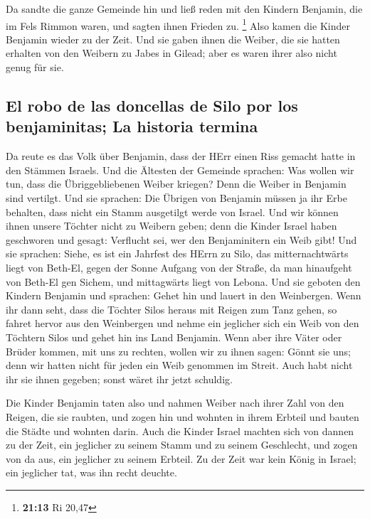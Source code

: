  Da sandte die ganze Gemeinde hin und ließ reden mit den
Kindern Benjamin, die im Fels Rimmon waren, und sagten ihnen Frieden zu.
\footnote{\textbf{21:13} Ri 20,47}  Also kamen die Kinder
Benjamin wieder zu der Zeit. Und sie gaben ihnen die Weiber, die sie
hatten erhalten von den Weibern zu Jabes in Gilead; aber es waren ihrer
also nicht genug für sie.

\hypertarget{el-robo-de-las-doncellas-de-silo-por-los-benjaminitas-la-historia-termina}{%
\subsection{El robo de las doncellas de Silo por los benjaminitas; La
historia
termina}\label{el-robo-de-las-doncellas-de-silo-por-los-benjaminitas-la-historia-termina}}

 Da reute es das Volk über Benjamin, dass der HErr einen
Riss gemacht hatte in den Stämmen Israels.  Und die
Ältesten der Gemeinde sprachen: Was wollen wir tun, dass die
Übriggebliebenen Weiber kriegen? Denn die Weiber in Benjamin sind
vertilgt.  Und sie sprachen: Die Übrigen von Benjamin
müssen ja ihr Erbe behalten, dass nicht ein Stamm ausgetilgt werde von
Israel.  Und wir können ihnen unsere Töchter nicht zu
Weibern geben; denn die Kinder Israel haben geschworen und gesagt:
Verflucht sei, wer den Benjaminitern ein Weib gibt!  Und
sie sprachen: Siehe, es ist ein Jahrfest des HErrn zu Silo, das
mitternachtwärts liegt von Beth-El, gegen der Sonne Aufgang von der
Straße, da man hinaufgeht von Beth-El gen Sichem, und mittagwärts liegt
von Lebona.  Und sie geboten den Kindern Benjamin und
sprachen: Gehet hin und lauert in den Weinbergen.  Wenn
ihr dann seht, dass die Töchter Silos heraus mit Reigen zum Tanz gehen,
so fahret hervor aus den Weinbergen und nehme ein jeglicher sich ein
Weib von den Töchtern Silos und gehet hin ins Land Benjamin.
 Wenn aber ihre Väter oder Brüder kommen, mit uns zu
rechten, wollen wir zu ihnen sagen: Gönnt sie uns; denn wir hatten nicht
für jeden ein Weib genommen im Streit. Auch habt nicht ihr sie ihnen
gegeben; sonst wäret ihr jetzt schuldig.

 Die Kinder Benjamin taten also und nahmen Weiber nach
ihrer Zahl von den Reigen, die sie raubten, und zogen hin und wohnten in
ihrem Erbteil und bauten die Städte und wohnten darin. 
Auch die Kinder Israel machten sich von dannen zu der Zeit, ein
jeglicher zu seinem Stamm und zu seinem Geschlecht, und zogen von da
aus, ein jeglicher zu seinem Erbteil.  Zu der Zeit war
kein König in Israel; ein jeglicher tat, was ihn recht deuchte.
